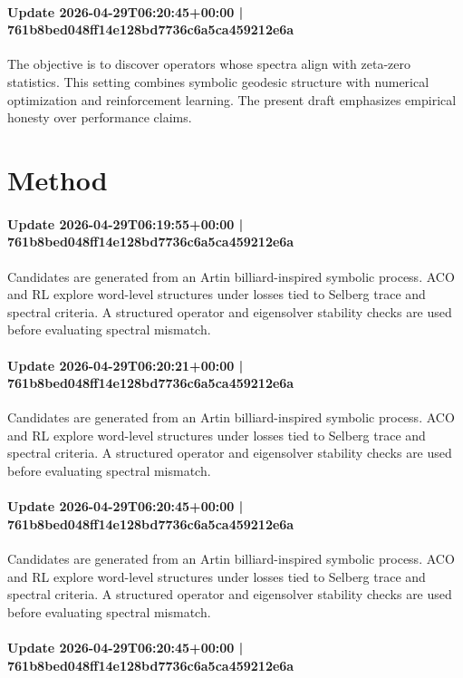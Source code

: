 \documentclass{article}
\begin{document}
\paragraph{Update 2026-04-29T06:20:45+00:00 | 761b8bed048ff14e128bd7736c6a5ca459212e6a}

The objective is to discover operators whose spectra align with zeta-zero statistics. This setting combines symbolic geodesic structure with numerical optimization and reinforcement learning. The present draft emphasizes empirical honesty over performance claims.

\section{Method}
\paragraph{Update 2026-04-29T06:19:55+00:00 | 761b8bed048ff14e128bd7736c6a5ca459212e6a}

Candidates are generated from an Artin billiard-inspired symbolic process. ACO and RL explore word-level structures under losses tied to Selberg trace and spectral criteria. A structured operator and eigensolver stability checks are used before evaluating spectral mismatch.

\paragraph{Update 2026-04-29T06:20:21+00:00 | 761b8bed048ff14e128bd7736c6a5ca459212e6a}

Candidates are generated from an Artin billiard-inspired symbolic process. ACO and RL explore word-level structures under losses tied to Selberg trace and spectral criteria. A structured operator and eigensolver stability checks are used before evaluating spectral mismatch.

\paragraph{Update 2026-04-29T06:20:45+00:00 | 761b8bed048ff14e128bd7736c6a5ca459212e6a}

Candidates are generated from an Artin billiard-inspired symbolic process. ACO and RL explore word-level structures under losses tied to Selberg trace and spectral criteria. A structured operator and eigensolver stability checks are used before evaluating spectral mismatch.

\paragraph{Update 2026-04-29T06:20:45+00:00 | 761b8bed048ff14e128bd7736c6a5ca459212e6a}
\end{document}
